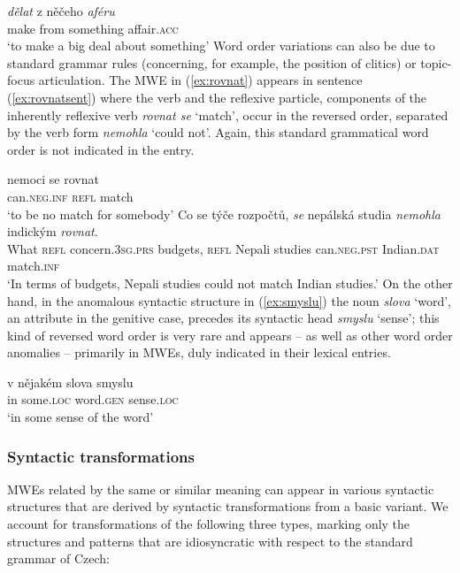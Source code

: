 \documentclass[output=paper,colorlinks,citecolor=brown]{langscibook}
\begin{document}
\ea  \label{ex:aferu}
\gll \emph{dělat} z něčeho \emph{aféru}\\
     make from something affair.\textsc{acc}\\
\glt `to make a big deal about something'
\z
\noindent
Word order variations can also be due to standard grammar rules (concerning, for example, the position of clitics) or topic-focus articulation. The MWE in (\ref{ex:rovnat}) appears in sentence (\ref{ex:rovnatsent}) where the verb and the reflexive particle, components of the inherently reflexive verb \emph{rovnat se} ‘match’, occur in the reversed order, separated by the verb form \emph{nemohla} ‘could not’. Again, this standard grammatical word order is not indicated in the entry.

\ea
\ea  \label{ex:rovnat}
\gll nemoci se rovnat\\
     can.\textsc{neg.inf} \textsc{refl} match\\
\glt `to be no match for somebody'
\ex  \label{ex:rovnatsent}
\gll Co se týče rozpočtů, \emph{se} nepálská studia \emph{nemohla} indickým \emph{rovnat}.\\
     What \textsc{refl} concern.\textsc{3sg.prs} budgets, \textsc{refl} Nepali studies can.\textsc{neg.pst} Indian.\textsc{dat} match.\textsc{inf}\\
\glt `In terms of budgets, Nepali studies could not match Indian studies.'
\z
\z
\noindent
On the other hand, in the anomalous syntactic structure in (\ref{ex:smyslu}) the noun \emph{slova} ‘word’, an attribute in the genitive case, precedes its syntactic head \emph{smyslu} `sense'; this kind of reversed word order is very rare and appears -- as well as other word order anomalies -- primarily in MWEs, duly indicated in their lexical entries.

\ea \label{ex:smyslu}
\gll v nějakém slova smyslu\\
     in some.\textsc{loc}
     word.\textsc{gen} sense.\textsc{loc}\\
\glt `in some sense of the word'
\z

\subsubsection{Syntactic transformations}
\label{variability-synt-trans}
MWEs related by the same or
similar meaning can appear in various syntactic structures
that are derived by syntactic transformations from a basic variant. We
account for transformations of the following three types, marking only the structures and patterns that are
idiosyncratic with respect to the standard grammar of Czech:
\end{document}
